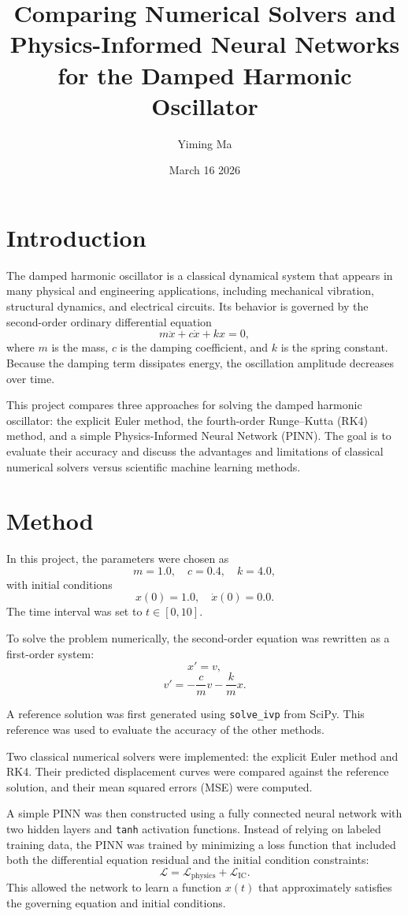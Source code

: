 \documentclass[10pt]{article}
\title{\textbf{Comparing Numerical Solvers and Physics-Informed Neural Networks for the Damped Harmonic Oscillator}}
\author{Yiming Ma}
\date{March 16 2026}
\begin{document}
\maketitle

\section*{Introduction}
The damped harmonic oscillator is a classical dynamical system that appears in many physical and engineering applications, including mechanical vibration, structural dynamics, and electrical circuits. Its behavior is governed by the second-order ordinary differential equation
\[
m\ddot{x} + c\dot{x} + kx = 0,
\]
where $m$ is the mass, $c$ is the damping coefficient, and $k$ is the spring constant. Because the damping term dissipates energy, the oscillation amplitude decreases over time.

This project compares three approaches for solving the damped harmonic oscillator: the explicit Euler method, the fourth-order Runge--Kutta (RK4) method, and a simple Physics-Informed Neural Network (PINN). The goal is to evaluate their accuracy and discuss the advantages and limitations of classical numerical solvers versus scientific machine learning methods.

\section*{Method}
In this project, the parameters were chosen as
\[
m = 1.0, \quad c = 0.4, \quad k = 4.0,
\]
with initial conditions
\[
x(0) = 1.0, \quad \dot{x}(0) = 0.0.
\]
The time interval was set to $t \in [0,10]$.

To solve the problem numerically, the second-order equation was rewritten as a first-order system:
\[
x' = v,
\]
\[
v' = -\frac{c}{m}v - \frac{k}{m}x.
\]

A reference solution was first generated using \texttt{solve\_ivp} from SciPy. This reference was used to evaluate the accuracy of the other methods.

Two classical numerical solvers were implemented: the explicit Euler method and RK4. Their predicted displacement curves were compared against the reference solution, and their mean squared errors (MSE) were computed.

A simple PINN was then constructed using a fully connected neural network with two hidden layers and \texttt{tanh} activation functions. Instead of relying on labeled training data, the PINN was trained by minimizing a loss function that included both the differential equation residual and the initial condition constraints:
\[
\mathcal{L} = \mathcal{L}_{\text{physics}} + \mathcal{L}_{\text{IC}}.
\]
This allowed the network to learn a function $x(t)$ that approximately satisfies the governing equation and initial conditions.
\end{document}
